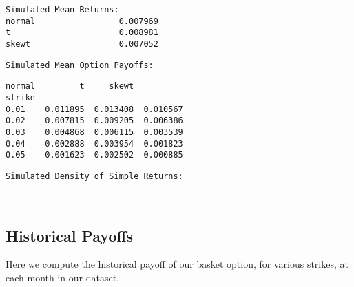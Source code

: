 \documentclass[11pt]{article}
\begin{document}
    
    \begin{Verbatim}[commandchars=\\\{\}]
        Simulated Mean Returns:
normal                 0.007969
t                      0.008981
skewt                  0.007052
    \end{Verbatim}

    
    \begin{Verbatim}[commandchars=\\\{\}]
Simulated Mean Option Payoffs:
    \end{Verbatim}

    
    \begin{Verbatim}[commandchars=\\\{\}]
          normal         t     skewt
strike                              
0.01    0.011895  0.013408  0.010567
0.02    0.007815  0.009205  0.006386
0.03    0.004868  0.006115  0.003539
0.04    0.002888  0.003954  0.001823
0.05    0.001623  0.002502  0.000885
    \end{Verbatim}

    
    \begin{Verbatim}[commandchars=\\\{\}]
Simulated Density of Simple Returns:
    \end{Verbatim}

    \begin{center}
    \end{center}
    { \hspace*{\fill} \\}
    
    \subsection{Historical Payoffs}\label{historical-payoffs}

Here we compute the historical payoff of our basket option, for various
strikes, at each month in our dataset.
\end{document}

